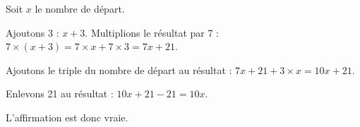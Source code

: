 
\medskip

Soit $x$ le nombre de départ.

Ajoutons 3 : $x + 3$. Multiplions le résultat par 7 : $7\times (x + 3) = 7\times x+7\times 3 = 7x + 21$.

Ajoutons le triple du nombre de départ au résultat : $7x + 21 + 3\times x = 10x + 21$.

Enlevons 21 au résultat : $10x + 21 - 21 = 10x$.

L'affirmation est donc  vraie.

\vspace{0,5cm}

